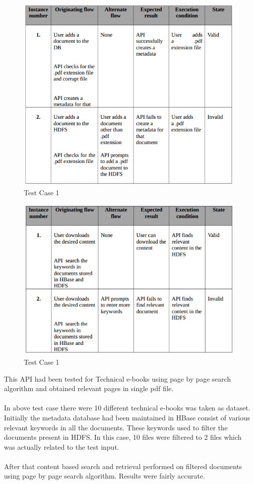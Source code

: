 \documentclass[oneside,a4paper,12pt]{report}
\begin{document}
{\begin{figure}[h]
\includegraphics{test-case-2}
\caption{Test Case 1}
\end{figure}

\begin{figure}[h]
\includegraphics{test-case-3}
\caption{Test Case 1}
\end{figure}

This API had been tested for Technical e-books using page by page search algorithm and obtained relevant pages in single pdf file.\\\\
In above test case there were 10 different technical e-books was taken as dataset. Initially the metadata database had been maintained  in HBase consist of various relevant keywords in all the documents. These keywords used to filter the documents present in HDFS. In this case, 10 files were filtered to 2 files which was actually related to the test input.\\\\
After that content based search and retrieval performed on filtered documents using page by page search algorithm. Results were fairly accurate.


}
\end{document}

